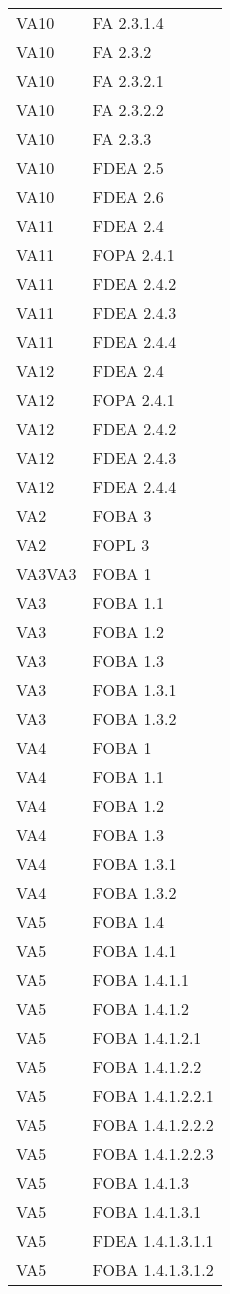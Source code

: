 \begin{longtable}{XX}
VA10&FA 2.3.1.4\\ 
VA10&FA 2.3.2\\ 
VA10&FA 2.3.2.1\\ 
VA10&FA 2.3.2.2\\ 
VA10&FA 2.3.3\\ 
VA10&FDEA 2.5\\ 
VA10&FDEA 2.6\\ 
\midrule 
VA11&FDEA 2.4\\ 
VA11&FOPA 2.4.1\\ 
VA11&FDEA 2.4.2\\ 
VA11&FDEA 2.4.3\\ 
VA11&FDEA 2.4.4\\ 
\midrule 
VA12&FDEA 2.4\\ 
VA12&FOPA 2.4.1\\ 
VA12&FDEA 2.4.2\\ 
VA12&FDEA 2.4.3\\ 
VA12&FDEA 2.4.4\\ 
\midrule 
VA2&FOBA 3\\ 
VA2&FOPL 3\\ 
\midrule 
VA3VA3&FOBA 1\\ 
VA3&FOBA 1.1\\ 
VA3&FOBA 1.2\\ 
VA3&FOBA 1.3\\ 
VA3&FOBA 1.3.1\\ 
VA3&FOBA 1.3.2\\ 
\midrule 
VA4&FOBA 1\\ 
VA4&FOBA 1.1\\ 
VA4&FOBA 1.2\\ 
VA4&FOBA 1.3\\ 
VA4&FOBA 1.3.1\\ 
VA4&FOBA 1.3.2\\ 
\midrule 
VA5&FOBA 1.4\\ 
VA5&FOBA 1.4.1\\ 
VA5&FOBA 1.4.1.1\\ 
VA5&FOBA 1.4.1.2\\ 
VA5&FOBA 1.4.1.2.1\\ 
VA5&FOBA 1.4.1.2.2\\ 
VA5&FOBA 1.4.1.2.2.1\\ 
VA5&FOBA 1.4.1.2.2.2\\ 
VA5&FOBA 1.4.1.2.2.3\\ 
VA5&FOBA 1.4.1.3\\ 
VA5&FOBA 1.4.1.3.1\\ 
VA5&FDEA 1.4.1.3.1.1\\ 
VA5&FOBA 1.4.1.3.1.2\\ 

\end{longtable}

